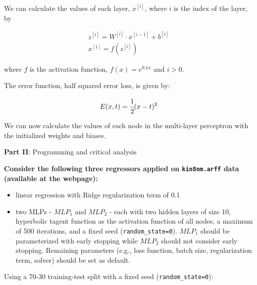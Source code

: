 \documentclass[12pt]{article}
\begin{document}
\begin{enumerate}[leftmargin=\labelsep]
          We can calculate the values of each layer, $x^{[i]}$, where $i$ is the
          index of the layer, by

          $$
              \begin{array}{c}
                  z^{[i]} = W^{[i]} \cdot x^{[i-1]} + b^{[i]} \\
                  x^{[1]} = f(z^{[i]})
              \end{array}
          $$

          where $f$ is the activation function, $f(x) = e^{0.1x}$ and $i > 0$.

          The error function, half squared error loss, is given by:

          $$
              E(x, t) = \cfrac{1}{2}(x - t)^2
          $$

          \vspace*{0.5cm}

          We can now calculate the values of each node in the multi-layer perceptron
          with the initialized weights and biases.

\end{enumerate}

\pagebreak

\begin{center}
    \large{\textbf{Part II}: Programming and critical analysis}
\end{center}

{\color{questioncolor}\bfseries
\noindent
Consider the following three regressors applied on \texttt{kin8nm.arff} data
(available at the webpage):
\begin{itemize}
    \item linear regression with Ridge regularization term of 0.1
    \item two MLPs - $MLP_1$ and $MLP_2$ - each with two hidden layers of
          size 10, hyperbolic tagent function as the activation function of all nodes,
          a maximum of 500 iterations, and a fixed seed (\texttt{random\_state=0}).
          $MLP_1$ should be parameterized with early stopping while $MLP_2$ should not
          consider early stopping.
          Remaining parameters (e.g., loss function, batch size, regularization term,
          solver) should be set as default.
\end{itemize}
Using a 70-30 training-test split with a fixed seed (\texttt{random\_state=0}):
}
\end{document}
